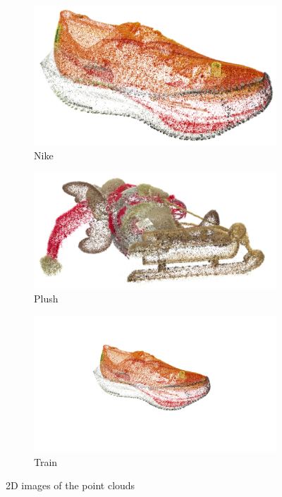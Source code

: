 \documentclass{article}
\begin{document}
\begin{figure}[H]
    \centering
    \begin{subfigure}{0.32\textwidth}
        \includegraphics[width=\textwidth]{nike.png}
        \caption{Nike}
    \end{subfigure}
    \begin{subfigure}{0.32\textwidth}
        \includegraphics[width=\textwidth]{plush.png}
        \caption{Plush}
    \end{subfigure}
    \begin{subfigure}{0.32\textwidth}
        \includegraphics[width=\textwidth]{train.png}
        \caption{Train}
    \end{subfigure}
    \caption{2D images of the point clouds}
    \label{fig:images}
\end{figure}
\end{document}
